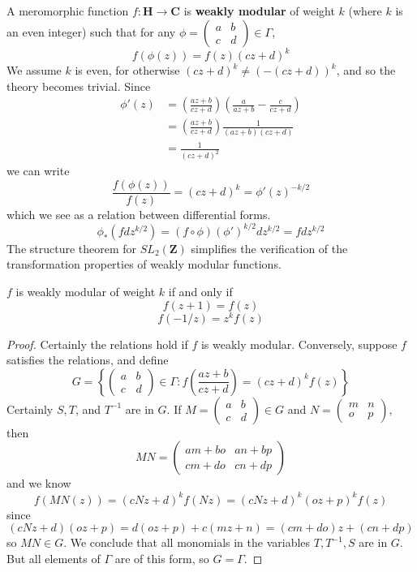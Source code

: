 A meromorphic function $f: \mathbf{H} \to \mathbf{C}$ is {\bf weakly modular} of weight $k$ (where $k$ is an even integer) such that for any $\phi = \left(\begin{smallmatrix} a & b \\ c & d \end{smallmatrix}\right) \in \Gamma$,
%
\[ f(\phi(z)) = f(z) (cz + d)^k \]
%
We assume $k$ is even, for otherwise $(cz + d)^k \neq (-(cz + d))^k$, and so the theory becomes trivial. Since
%
\begin{align*}
    \phi'(z) &= \left( \frac{az + b}{cz + d} \right) \left( \frac{a}{az + b} - \frac{c}{cz + d} \right)\\
    &= \left( \frac{az + b}{cz + d} \right) \frac{1}{(az + b)(cz + d)}\\
    &= \frac{1}{(cz + d)^2}
\end{align*}
%
we can write
%
\[ \frac{f(\phi(z))}{f(z)}  = (cz + d)^k = \phi'(z)^{-k/2} \]
%
which we see as a relation between differential forms.
%
\[ \phi_*(f dz^{k/2}) = (f \circ \phi) (\phi')^{k/2} dz^{k/2} = f dz^{k/2} \]
%
The structure theorem for $SL_2(\mathbf{Z})$ simplifies the verification of the transformation properties of weakly modular functions.

\begin{theorem}
    $f$ is weakly modular of weight $k$ if and only if
    \[ f(z + 1) = f(z) \]
    \[ f(-1/z) = z^k f(z) \]
\end{theorem}
\begin{proof}
    Certainly the relations hold if $f$ is weakly modular. Conversely, suppose $f$ satisfies the relations, and define
    \[ G = \left\{ \begin{pmatrix} a & b \\ c & d \end{pmatrix} \in \Gamma : f\left(\frac{az + b}{cz + d}\right) = (cz + d)^k f(z) \right\} \]
    Certainly $S, T$, and $T^{-1}$ are in $G$. If $M = \begin{pmatrix} a & b \\ c & d \end{pmatrix} \in G$ and $N = \begin{pmatrix} m & n \\ o & p \end{pmatrix}$, then
    \[ MN = \begin{pmatrix} am + bo & an + bp \\ cm + do & cn + dp \end{pmatrix} \]
    and we know
    \[ f\left( MN(z) \right) = (cNz + d)^k f(Nz) = (cNz + d)^k (oz + p)^k f(z) \]
    since
    \[ (cNz + d)(oz + p) = d(oz + p) + c(mz + n) = (cm + do)z + (cn + dp) \]
    so $MN \in G$. We conclude that all monomials in the variables $T, T^{-1}, S$ are in $G$. But all elements of $\Gamma$ are of this form, so $G = \Gamma$.
\end{proof}

